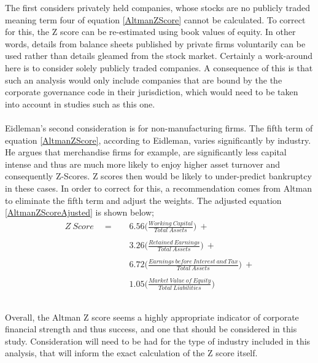 {The first considers privately held companies, whose stocks are no publicly traded meaning term four of equation \ref{AltmanZScore} cannot be calculated. To correct for this, the Z score can be re-estimated using book values of equity. In other words, details from balance sheets published by private firms voluntarily can be used rather than details gleamed from the stock market. Certainly a work-around here is to consider solely publicly traded companies. A consequence of this is that such an analysis would only include companies that are bound by the the corporate governance code in their jurisdiction, which would need to be taken into account in studies such as this one.\\\\ Eidleman's second consideration is for non-manufacturing firms. The fifth term of equation \ref{AltmanZScore}, according to Eidleman, varies significantly by industry. He argues that merchandise firms for example, are significantly less capital intense and thus are much more likely to enjoy higher asset turnover and consequently Z-Scores. Z scores then would be likely to under-predict bankruptcy in these cases. In order to correct for this, a recommendation comes from Altman to eliminate the fifth term and adjust the weights. 
\clearpage
The adjusted equation \ref{AltmanZScoreAjusted} is shown below;
\begin {equation}\label{AltmanZScoreAjusted}
\begin{aligned}
Z \ Score \quad =  \quad & 6.56\bigg(\frac{Working \ Capital}{Total \ Assets}\bigg) \ + \\\\
		& 3.26\bigg({\frac{Retained \ Earnings}{Total \ Assets}}\bigg) \ + \\\\
		& 6.72\bigg({\frac{Earnings \ before \ Interest \ and \ Tax}{Total \ Assets}}\bigg) \ + \\\\
		& 1.05\bigg({\frac{Market \ Value \ of \ Equity}{Total \ Liabilities}}\bigg) \ \\\\ 
\end{aligned}
\end{equation}\\
Overall, the Altman Z score seems a highly appropriate indicator of corporate financial strength and thus success, and one that should be considered in this study. Consideration will need to be had for the type of industry included in this analysis, that will inform the exact calculation of the Z score itself. }

